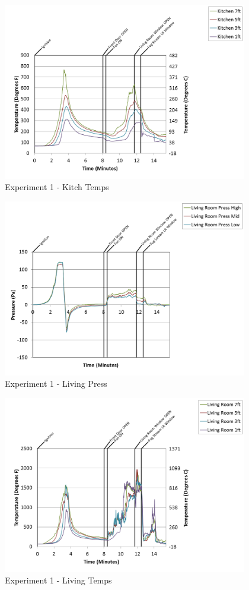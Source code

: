 \documentclass{article}
\begin{document}
\begin{appendices}
\clearpage

\begin{figure}[h!]
	\centering
	\includegraphics[height=3.05in]{0_Images/Results_Charts/Exp_1_Charts/KitchTemps.png}
	\caption{Experiment 1 - Kitch Temps}
\end{figure}


\begin{figure}[h!]
	\centering
	\includegraphics[height=3.05in]{0_Images/Results_Charts/Exp_1_Charts/LivingPress.png}
	\caption{Experiment 1 - Living Press}
\end{figure}

\clearpage

\begin{figure}[h!]
	\centering
	\includegraphics[height=3.05in]{0_Images/Results_Charts/Exp_1_Charts/LivingTemps.png}
	\caption{Experiment 1 - Living Temps}
\end{figure}



\end{appendices}
\end{document}
